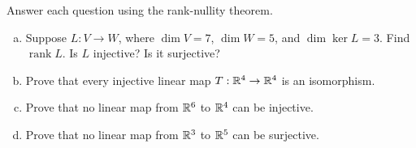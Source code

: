\begin{exercise}
  \label{ex:hw04:rank-nullity}
  Answer each question using the rank-nullity theorem.
  \begin{enumerate}[(a)][2]
    \item Suppose \(L:V\to W\), where \(\dim V=7\), \(\dim W=5\),
      and \(\dim\ker L=3\). Find \(\operatorname{rank}L\).
      Is \(L\) injective? Is it surjective?
    \item Prove that every injective linear map \(T:\mathbb{R}^4\to\mathbb{R}^4\)
      is an isomorphism.
    \item Prove that no linear map from \(\mathbb{R}^6\) to \(\mathbb{R}^4\)
      can be injective.
    \item Prove that no linear map from \(\mathbb{R}^3\) to \(\mathbb{R}^5\)
      can be surjective.
  \end{enumerate}
\end{exercise}
